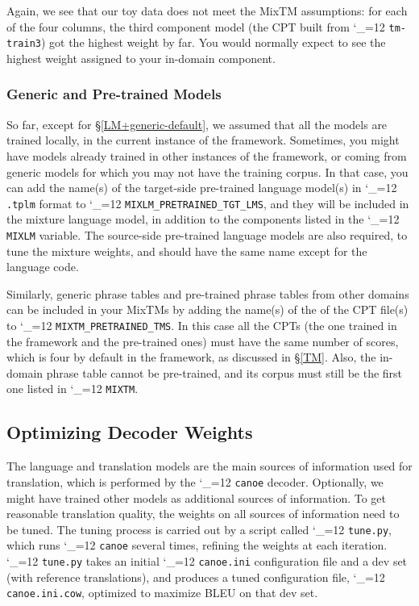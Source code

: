 \documentclass[11pt,letterpaper]{article}
\newcommand{\TODO}[1]{\emph{\textbf{\textcolor{red}{<TODO> #1 </TODO>}}}}
\def\code{\begingroup\catcode`\_=12 \codex}
\newcommand{\codex}[1]{\texttt{#1}\endgroup}
\begin{document}
Again, we see that our toy data does not meet the MixTM assumptions: for each
of the four columns, the third component model (the CPT built from
\code{tm-train3}) got the highest weight by far. You would normally expect to
see the highest weight assigned to your in-domain component.

\subsubsection{Generic and Pre-trained Models} \label{Generic}


So far, except for \S\ref{LM+generic-default}, we assumed that all the models
are trained locally, in the current instance of the framework.  Sometimes, you
might have models already trained in
other instances of the framework, or coming from generic models for which you
may not have the training corpus.  In that case, you can add the name(s) of the
target-side pre-trained language model(s) in \code{.tplm} format to
\code{MIXLM_PRETRAINED_TGT_LMS}, and they will be included in the mixture
language model, in addition to the components listed in the \code{MIXLM}
variable.  The source-side pre-trained language models are also required,
to tune the mixture weights, and should have the same name except for the
language code.

Similarly, generic phrase tables and pre-trained phrase tables from other
domains can be included in your MixTMs by adding the name(s) of the of the CPT
file(s) to \code{MIXTM_PRETRAINED_TMS}.  In this case all the CPTs (the one
trained in the framework and the pre-trained ones) must have the same number of
scores, which is four by default in the framework, as discussed in \S\ref{TM}.
Also, the in-domain phrase table cannot be pre-trained, and its corpus must
still be the first one listed in \code{MIXTM}.

\subsection{Optimizing Decoder Weights} \label{COW}

The language and translation models are the main sources of information used
for translation, which is performed by the \code{canoe} decoder.  Optionally,
we might have trained other models as additional sources of information.
To get reasonable
translation quality, the weights on all sources of information
need to be tuned. The tuning process is carried out by a script called
\code{tune.py}, which runs \code{canoe} several times, refining the weights at
each iteration.  \code{tune.py} takes an initial \code{canoe.ini} configuration
file and a dev set (with reference translations), and produces a tuned
configuration file, \code{canoe.ini.cow}, optimized to maximize BLEU on that
dev set.
\end{document}
